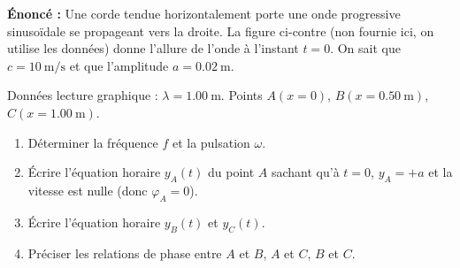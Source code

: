 \documentclass[11pt]{article}
\begin{document}
\begin{exoresolu}
\textbf{Énoncé :} Une corde tendue horizontalement porte une onde progressive sinusoïdale se propageant vers la droite. La figure ci-contre (non fournie ici, on utilise les données) donne l'allure de l'onde à l'instant $t=0$. On sait que $c = \SI{10}{\meter\per\second}$ et que l'amplitude $a = \SI{0,02}{\meter}$.
\begin{center}
\end{center}
Données lecture graphique : $\lambda = \SI{1,00}{\meter}$. Points $A(x=0)$, $B(x=\SI{0,50}{\meter})$, $C(x=\SI{1,00}{\meter})$.
\begin{enumerate}
    \item Déterminer la fréquence $f$ et la pulsation $\omega$.
    \item Écrire l'équation horaire $y_A(t)$ du point $A$ sachant qu'à $t=0$, $y_A = +a$ et la vitesse est nulle (donc $\varphi_A=0$).
    \item Écrire l'équation horaire $y_B(t)$ et $y_C(t)$.
    \item Préciser les relations de phase entre $A$ et $B$, $A$ et $C$, $B$ et $C$.
\end{enumerate}

\tcblower


\end{exoresolu}
\end{document}
